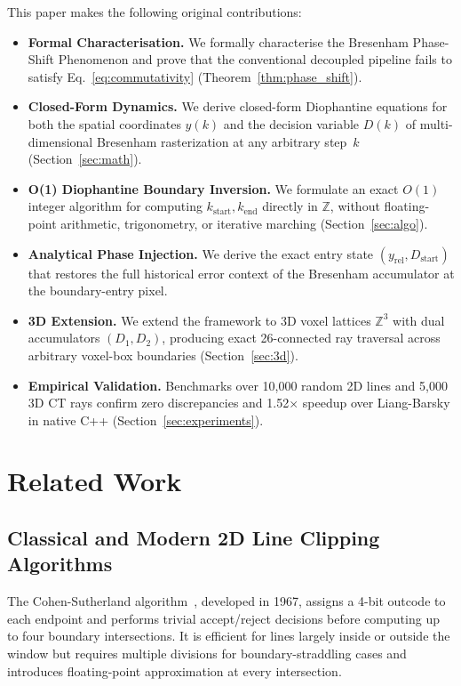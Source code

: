 \documentclass[12pt,a4paper]{article}
\theoremstyle{definition}
\newcommand{\Z}{\mathbb{Z}}
\newcommand{\Zth}{\mathbb{Z}^3}
\newcommand{\kst}{k_{\mathrm{start}}}
\newcommand{\ken}{k_{\mathrm{end}}}
\begin{document}
This paper makes the following original contributions:
\begin{itemize}
  \item[\textbf{C1.}] \textbf{Formal Characterisation.}
    We formally characterise the Bresenham Phase-Shift
    Phenomenon and prove that the conventional decoupled
    pipeline fails to satisfy Eq.~\eqref{eq:commutativity}
    (Theorem~\ref{thm:phase_shift}).
  \item[\textbf{C2.}] \textbf{Closed-Form Dynamics.}
    We derive closed-form Diophantine equations for both
    the spatial coordinates $y(k)$ and the decision
    variable $D(k)$ of multi-dimensional Bresenham
    rasterization at any arbitrary step~$k$
    (Section~\ref{sec:math}).
  \item[\textbf{C3.}] \textbf{O(1) Diophantine Boundary
    Inversion.}  We formulate an exact $O(1)$ integer
    algorithm for computing $\kst, \ken$ directly in $\Z$,
    without floating-point arithmetic, trigonometry, or
    iterative marching (Section~\ref{sec:algo}).
  \item[\textbf{C4.}] \textbf{Analytical Phase Injection.}
    We derive the exact entry state
    $(y_{\mathrm{rel}}, D_{\mathrm{start}})$ that restores
    the full historical error context of the Bresenham
    accumulator at the boundary-entry pixel.
  \item[\textbf{C5.}] \textbf{3D Extension.}  We extend
    the framework to 3D voxel lattices $\Zth$ with dual
    accumulators $(D_1, D_2)$, producing exact 26-connected
    ray traversal across arbitrary voxel-box boundaries
    (Section~\ref{sec:3d}).
  \item[\textbf{C6.}] \textbf{Empirical Validation.}
    Benchmarks over 10,000 random 2D lines and 5,000 3D
    CT rays confirm zero discrepancies and 1.52$\times$
    speedup over Liang-Barsky in native C++
    (Section~\ref{sec:experiments}).
\end{itemize}

\section{Related Work}
\label{sec:related}

\subsection{Classical and Modern 2D Line Clipping Algorithms}

The Cohen-Sutherland algorithm~\cite{sproull1968clipping},
developed in 1967, assigns a 4-bit outcode to each endpoint
and performs trivial accept/reject decisions before computing
up to four boundary intersections. It is efficient for lines
largely inside or outside the window but requires multiple
divisions for boundary-straddling cases and introduces
floating-point approximation at every intersection.
\end{document}

